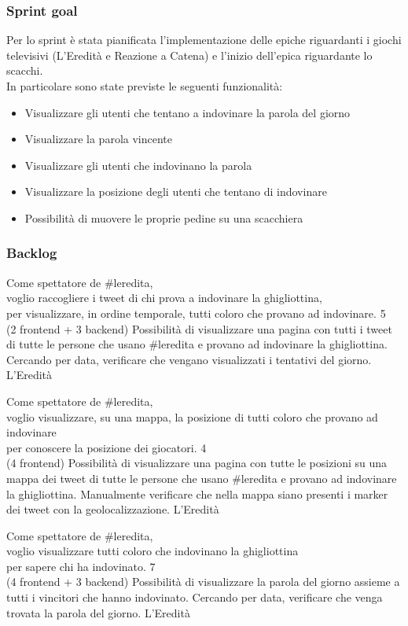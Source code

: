 \subsubsection{Sprint goal}
Per lo sprint è stata pianificata l'implementazione delle epiche riguardanti i giochi televisivi (L'Eredità e Reazione a Catena) e
l'inizio dell'epica riguardante lo scacchi.\\
In particolare sono state previste le seguenti funzionalità:
\begin{itemize}
    \item Visualizzare gli utenti che tentano a indovinare la parola del giorno
    \item Visualizzare la parola vincente
    \item Visualizzare gli utenti che indovinano la parola
    \item Visualizzare la posizione degli utenti che tentano di indovinare
    \item Possibilità di muovere le proprie pedine su una scacchiera
\end{itemize}


\subsubsection{Backlog}
\userstory%
{Come spettatore de \#leredita,\\voglio raccogliere i tweet di chi prova a indovinare la ghigliottina,\\per visualizzare, in ordine temporale, tutti coloro che provano ad indovinare.}%
{5\\(2 frontend + 3 backend)}%
{Possibilità di visualizzare una pagina con tutti i tweet di tutte le persone che usano \#leredita e provano ad indovinare la ghigliottina.}%
{Cercando per data, verificare che vengano visualizzati i tentativi del giorno.}
{L'Eredità}

\userstory%
{Come spettatore de \#leredita,\\voglio visualizzare, su una mappa, la posizione di tutti coloro che provano ad indovinare\\per conoscere la posizione dei giocatori.}%
{4\\(4 frontend)}%
{Possibilità di visualizzare una pagina con tutte le posizioni su una mappa dei tweet di tutte le persone che usano \#leredita e provano ad indovinare la ghigliottina.}%
{Manualmente verificare che nella mappa siano presenti i marker dei tweet con la geolocalizzazione.}
{L'Eredità}

\userstory%
{Come spettatore de \#leredita,\\voglio visualizzare tutti coloro che indovinano la ghigliottina\\per sapere chi ha indovinato.}%
{7\\(4 frontend + 3 backend)}%
{Possibilità di visualizzare la parola del giorno assieme a tutti i vincitori che hanno indovinato.}%
{Cercando per data, verificare che venga trovata la parola del giorno.}
{L'Eredità}

